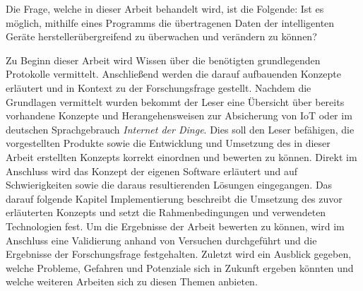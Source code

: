     Die Frage, welche in dieser Arbeit behandelt wird, ist die Folgende: 
    Ist es möglich, mithilfe eines Programms die übertragenen Daten der intelligenten Geräte herstellerübergreifend zu überwachen und verändern zu können?

    Zu Beginn dieser Arbeit wird Wissen über die benötigten grundlegenden Protokolle vermittelt.
    Anschließend werden die darauf aufbauenden Konzepte erläutert und in Kontext zu der Forschungsfrage gestellt.
    Nachdem die Grundlagen vermittelt wurden bekommt der Leser eine Übersicht über bereits vorhandene Konzepte und Herangehensweisen zur Absicherung von \ac{IoT} oder im deutschen Sprachgebrauch \emph{Internet der Dinge}. 
    Dies soll den Leser befähigen, die vorgestellten Produkte sowie die Entwicklung und Umsetzung des in dieser Arbeit erstellten Konzepts korrekt einordnen und bewerten zu können.
    Direkt im Anschluss wird das Konzept der eigenen Software erläutert und auf Schwierigkeiten sowie die daraus resultierenden Lösungen eingegangen. Das darauf folgende Kapitel \glqq Implementierung\grqq{} beschreibt die Umsetzung des zuvor erläuterten Konzepts und setzt die Rahmenbedingungen und verwendeten Technologien fest. Um die Ergebnisse der Arbeit bewerten zu können, wird im Anschluss eine Validierung anhand von Versuchen durchgeführt und die Ergebnisse der Forschungsfrage festgehalten. Zuletzt wird ein Ausblick gegeben, welche Probleme, Gefahren und Potenziale sich in Zukunft ergeben könnten und welche weiteren Arbeiten sich zu diesen Themen anbieten.
